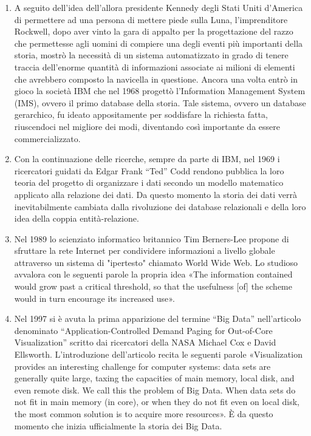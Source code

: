 \begin{enumerate}
    \item A seguito dell’idea dell’allora presidente Kennedy degli Stati Uniti d’America di permettere ad una persona di mettere piede sulla Luna, l’imprenditore Rockwell, dopo aver vinto la gara di appalto per la progettazione del razzo che permettesse agli uomini di compiere una degli eventi più importanti della storia, mostrò la necessità di un sistema automatizzato in grado di tenere traccia dell’enorme quantità di informazioni associate ai milioni di elementi che avrebbero composto la navicella in questione. Ancora una volta entrò in gioco la società IBM che nel 1968 progettò l’Information Management System (IMS), ovvero il primo database della storia. Tale sistema, ovvero un database gerarchico, fu ideato appositamente per soddisfare la richiesta fatta, riuscendoci nel migliore dei modi, diventando così importante da essere commercializzato.\cite{icm_information_management_system}
    \item Con la continuazione delle ricerche, sempre da parte di IBM, nel 1969 i ricercatori guidati da Edgar Frank “Ted” Codd rendono pubblica la loro teoria del progetto di organizzare i dati secondo un modello matematico applicato alla relazione dei dati. Da questo momento la storia dei dati verrà inevitabilmente cambiata dalla rivoluzione dei database relazionali e della loro idea della coppia entità-relazione.\cite{appunti_digitali_storia_dei_database}
    \item Nel 1989 lo scienziato informatico britannico Tim Berners-Lee propone di sfruttare la rete Internet per condividere informazioni a livello globale attraverso un sistema di "ipertesto" chiamato World Wide Web. Lo studioso avvalora con le seguenti parole la propria idea «The information contained would grow past a critical threshold, so that the usefulness [of] the scheme would in turn encourage its increased use».\cite{fp_big_data_history}
    \item Nel 1997 si è avuta la prima apparizione del termine “Big Data” nell’articolo denominato “Application-Controlled Demand Paging for Out-of-Core Visualization” scritto dai ricercatori della NASA Michael Cox e David Ellsworth. L’introduzione dell’articolo recita le seguenti parole «Visualization provides an interesting challenge for computer systems: data sets are generally quite large, taxing the capacities of main memory, local disk, and even remote disk. We call this the problem of Big Data. When data sets do not fit in main memory (in core), or when they do not fit even on local disk, the most common solution is to acquire more resources». È da questo momento che inizia ufficialmente la storia dei Big Data.\cite{researchgate_application_controlled}

\end{enumerate}
